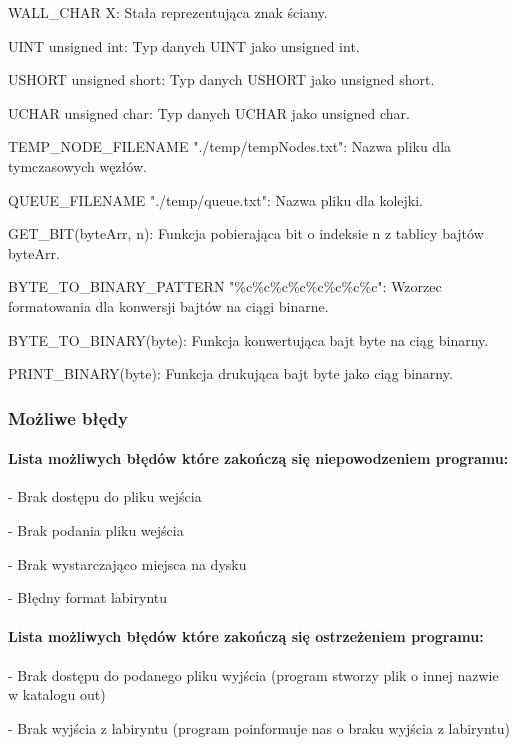 \documentclass[
]{article}
\begin{document}
WALL\_CHAR \textquotesingle X\textquotesingle: Stała reprezentująca znak
ściany.

UINT unsigned int: Typ danych UINT jako unsigned int.

USHORT unsigned short: Typ danych USHORT jako unsigned short.

UCHAR unsigned char: Typ danych UCHAR jako unsigned char.

TEMP\_NODE\_FILENAME "./temp/tempNodes.txt": Nazwa pliku dla
tymczasowych węzłów.

QUEUE\_FILENAME "./temp/queue.txt": Nazwa pliku dla kolejki.

GET\_BIT(byteArr, n): Funkcja pobierająca bit o indeksie n z tablicy
bajtów byteArr.

BYTE\_TO\_BINARY\_PATTERN "\%c\%c\%c\%c\%c\%c\%c\%c": Wzorzec
formatowania dla konwersji bajtów na ciągi binarne.

BYTE\_TO\_BINARY(byte): Funkcja konwertująca bajt byte na ciąg binarny.

PRINT\_BINARY(byte): Funkcja drukująca bajt byte jako ciąg binarny.

\hypertarget{moux17cliwe-bux142ux119dy}{%
\subsubsection{Możliwe błędy}\label{moux17cliwe-bux142ux119dy}}

\hypertarget{lista-moux17cliwych-bux142ux119duxf3w-ktuxf3re-zakoux144czux105-siux119-niepowodzeniem-programu}{%
\paragraph{Lista możliwych błędów które zakończą się niepowodzeniem
programu:}\label{lista-moux17cliwych-bux142ux119duxf3w-ktuxf3re-zakoux144czux105-siux119-niepowodzeniem-programu}}

- Brak dostępu do pliku wejścia

- Brak podania pliku wejścia

- Brak wystarczająco miejsca na dysku

- Błędny format labiryntu

\hypertarget{lista-moux17cliwych-bux142ux119duxf3w-ktuxf3re-zakoux144czux105-siux119-ostrzeux17ceniem-programu}{%
\paragraph{Lista możliwych błędów które zakończą się ostrzeżeniem
programu:}\label{lista-moux17cliwych-bux142ux119duxf3w-ktuxf3re-zakoux144czux105-siux119-ostrzeux17ceniem-programu}}

- Brak dostępu do podanego pliku wyjścia (program stworzy plik o innej
nazwie w katalogu out)

- Brak wyjścia z labiryntu (program poinformuje nas o braku wyjścia z
labiryntu)
\end{document}
